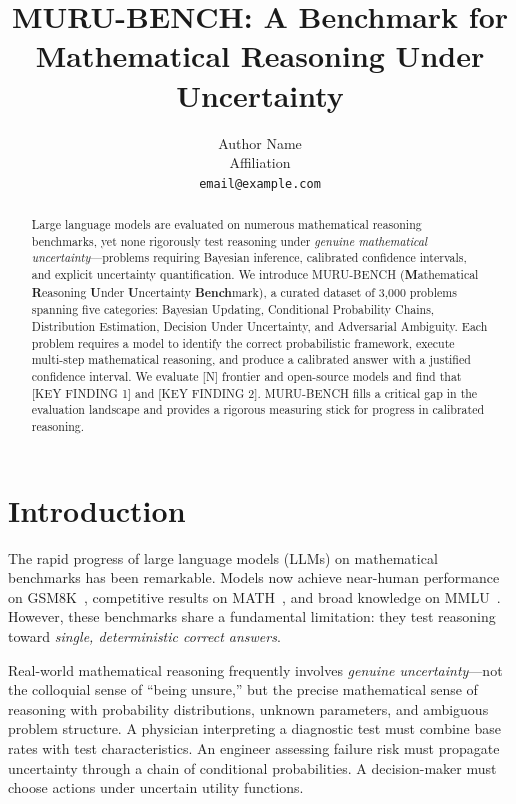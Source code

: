 \documentclass{article}
\title{MURU-BENCH: A Benchmark for Mathematical Reasoning Under Uncertainty}
\author{
  Author Name \\
  Affiliation \\
  \texttt{email@example.com}
}
\begin{document}
\maketitle

\begin{abstract}
Large language models are evaluated on numerous mathematical reasoning benchmarks, yet none rigorously test reasoning under \emph{genuine mathematical uncertainty}---problems requiring Bayesian inference, calibrated confidence intervals, and explicit uncertainty quantification. We introduce MURU-BENCH (\textbf{M}athematical \textbf{R}easoning \textbf{U}nder \textbf{U}ncertainty \textbf{Bench}mark), a curated dataset of 3{,}000 problems spanning five categories: Bayesian Updating, Conditional Probability Chains, Distribution Estimation, Decision Under Uncertainty, and Adversarial Ambiguity. Each problem requires a model to identify the correct probabilistic framework, execute multi-step mathematical reasoning, and produce a calibrated answer with a justified confidence interval. We evaluate [N] frontier and open-source models and find that [KEY FINDING 1] and [KEY FINDING 2]. MURU-BENCH fills a critical gap in the evaluation landscape and provides a rigorous measuring stick for progress in calibrated reasoning.

\end{abstract}

\section{Introduction}
\label{sec:introduction}

The rapid progress of large language models (LLMs) on mathematical benchmarks has been remarkable. Models now achieve near-human performance on GSM8K~\citep{gsm8k}, competitive results on MATH~\citep{math}, and broad knowledge on MMLU~\citep{mmlu}. However, these benchmarks share a fundamental limitation: they test reasoning toward \emph{single, deterministic correct answers}.

Real-world mathematical reasoning frequently involves \emph{genuine uncertainty}---not the colloquial sense of ``being unsure,'' but the precise mathematical sense of reasoning with probability distributions, unknown parameters, and ambiguous problem structure. A physician interpreting a diagnostic test must combine base rates with test characteristics. An engineer assessing failure risk must propagate uncertainty through a chain of conditional probabilities. A decision-maker must choose actions under uncertain utility functions.
\end{document}
